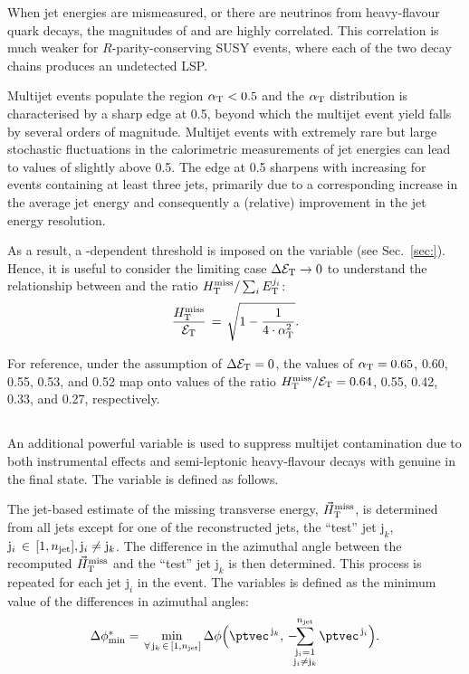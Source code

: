 When jet energies are mismeasured, or there are neutrinos from
heavy-flavour quark decays, the magnitudes of \HTmiss and \dst are
highly correlated. This correlation is much weaker for
$R$-parity-conserving SUSY events, where each of the two decay chains
produces an undetected LSP.

Multijet events populate the region $\alpha_{\text{T}}< 0.5$ and the $\alpha_{\text{T}}$
distribution is characterised by a sharp edge at 0.5, beyond which the
multijet event yield falls by several orders of magnitude. Multijet
events with extremely rare but large stochastic fluctuations in the
calorimetric measurements of jet energies can lead to values of
\alphat slightly above 0.5. The edge at 0.5 sharpens with increasing
\scalht for events containing at least three jets, primarily due to a
corresponding increase in the average jet energy and consequently a
(relative) improvement in the jet energy resolution.

As a result, a \scalht-dependent threshold is imposed on the \alphat
variable (see Sec.~\ref{sec:}). Hence, it is useful to consider the
limiting case $\Delta\mathcal{E}_\mathrm{T} \rightarrow 0$ to understand the relationship
between \alphat and the ratio $\mbox{$H_{\rm T}^{\rm miss}$}/\sum_{i} E_\textrm{T}^{j_i}$:
\begin{equation}
  \label{eq:alphat3}
  \frac{\mbox{$H_{\rm T}^{\rm miss}$}}{\mathcal{E}_\mathrm{T}} \, = \, \sqrt{ 1 - \frac{1}{4 \cdot \alpha_{\text{T}}^2} }.
\end{equation}

For reference, under the assumption of $\Delta\mathcal{E}_\mathrm{T} = 0$, the values of
$\alpha_{\text{T}} = 0.65$, 0.60, 0.55, 0.53, and 0.52 map onto values of the
ratio $\mbox{$H_{\rm T}^{\rm miss}$}/\mathcal{E}_\mathrm{T} = 0.64$, 0.55, 0.42, 0.33, and 0.27, respectively.

\subsection{\texorpdfstring{\bdphi}{biased dPhi}}

An additional powerful variable \bdphi is used to suppress multijet
contamination due to both instrumental effects and semi-leptonic
heavy-flavour decays with genuine \met in the final state. The
variable is defined as follows.

The jet-based estimate of the missing transverse energy, ${\mbox{$\vec{H}_{\rm T}^{\rm miss}$}}$,
is determined from all jets except for one of the reconstructed jets,
the ``test'' jet $\mathrm{j}_k$, \ie $\mathrm{j}_i \,\in\, [1,n_{\text{jet}}],
\mathrm{j}_i \ne \mathrm{j}_k$. The difference in the azimuthal angle
between the recomputed $\mbox{$\vec{H}_{\rm T}^{\rm miss}$}$ and the ``test'' jet $\mathrm{j}_k$
is then determined. This process is repeated for each jet
$\mathrm{j}_i$ in the event. The \bdphi variables is defined as the
minimum value of the differences in azimuthal angles:
\begin{equation}
  \bdphi = \min_{\,\forall\, \mathrm{j}_k\,\in\, [1,\njet]}
  \Delta\phi \Bigl( \ptvec^{\,\mathrm{j}_k}, \,
    -\hspace{-0.5em}\sum_{\substack{\mathrm{j}_i= 1 \\ \mathrm{j}_i \ne \mathrm{j}_k}}^{\njet}
    \ptvec^{\,\mathrm{j}_i} \Bigr).
  \label{eq:bdphi}
\end{equation}

